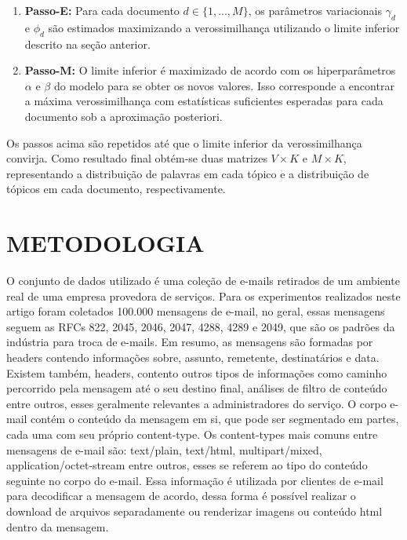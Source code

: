 \documentclass[12pt,a4paper]{article}
\begin{document}
  \begin{enumerate}
  \item \textbf{Passo-E:} Para cada documento $d \in \{1,. . . , M\}$, os parâmetros variacionais $\gamma_d$ e $\phi_d$ são estimados maximizando a verossimilhança utilizando o limite inferior descrito na seção anterior.
  \item \textbf{Passo-M:} O limite inferior é maximizado  de acordo com os hiperparâmetros $\alpha$ e $\beta$ do modelo para se obter os novos valores. Isso corresponde a encontrar a máxima verossimilhança com estatísticas suficientes esperadas para cada documento sob a aproximação posteriori.
  \end{enumerate}
  
  Os passos acima são repetidos até que o limite inferior da verossimilhança convirja. Como resultado final obtém-se duas matrizes $V \times K$ e $M \times K$, representando  a distribuição de palavras em cada tópico e a distribuição de tópicos em cada documento, respectivamente.
  
  
  
  \section{METODOLOGIA}
  O conjunto de dados utilizado é uma coleção de e-mails retirados de um ambiente real de uma empresa provedora de serviços. Para os experimentos realizados neste artigo foram coletados 100.000 mensagens de e-mail, no geral, essas mensagens seguem as RFCs 822, 2045, 2046, 2047, 4288, 4289 e 2049, que são os padrões da indústria para troca de e-mails.
    Em resumo, as mensagens são formadas por headers contendo informações sobre, assunto, remetente, destinatários e data. Existem também, headers, contento outros tipos de informações como caminho percorrido pela mensagem até o seu destino final, análises de filtro de conteúdo entre outros, esses geralmente relevantes a administradores do serviço. O corpo e-mail contém o conteúdo da mensagem em si, que pode ser segmentado em  partes, cada uma com seu próprio content-type. Os content-types mais comuns entre mensagens de e-mail são: text/plain, text/html, multipart/mixed, application/octet-stream entre outros, esses se referem ao tipo do conteúdo seguinte no corpo do e-mail. Essa informação é utilizada por clientes de e-mail para decodificar a mensagem de acordo, dessa forma é possível realizar o download de arquivos separadamente ou renderizar imagens ou conteúdo html dentro da mensagem.
  
\end{document}
